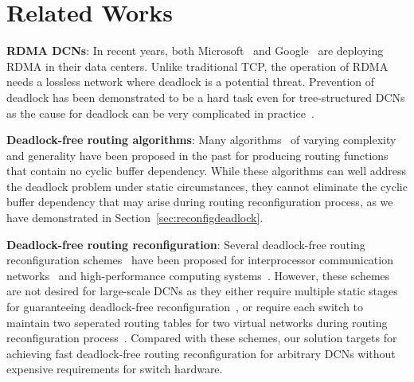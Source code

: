 \section{Related Works}\label{sec:related}

\textbf{RDMA DCNs}: In recent years, both Microsoft~\cite{dcqcn,rdmaatscale} and Google~\cite{timely} are deploying RDMA in their data centers. Unlike traditional TCP, the operation of RDMA needs a lossless network where deadlock is a potential threat. Prevention of deadlock has been demonstrated to be  a hard task even for tree-structured DCNs as the cause for deadlock can be very complicated in practice~\cite{rdmaatscale}.

\textbf{Deadlock-free routing algorithms}: Many algorithms~\cite{tcp-bolt,dally,flich2012survey,sancho2004} of varying complexity and generality have been proposed in the past for producing routing functions that contain no cyclic buffer dependency. While these algorithms can well address the deadlock problem under static circumstances, they cannot eliminate the cyclic buffer dependency that may arise during routing reconfiguration process, as we have demonstrated in Section~\ref{sec:reconfigdeadlock}.



\textbf{Deadlock-free routing reconfiguration}: Several deadlock-free routing reconfiguration schemes~\cite{automatic,lysne2005methodology,doublescheme} have been proposed for interprocessor communication networks~\cite{gara2005overview} and high-performance computing systems~\cite{infiniband}. However, these schemes are not desired for large-scale DCNs as they either require multiple static stages for guaranteeing deadlock-free reconfiguration~\cite{automatic,lysne2005methodology}, or require each switch to maintain two seperated routing tables for two virtual networks during routing reconfiguration process~\cite{doublescheme}. Compared with these schemes, our solution targets for achieving fast deadlock-free routing reconfiguration for arbitrary DCNs without expensive requirements for switch hardware. 

